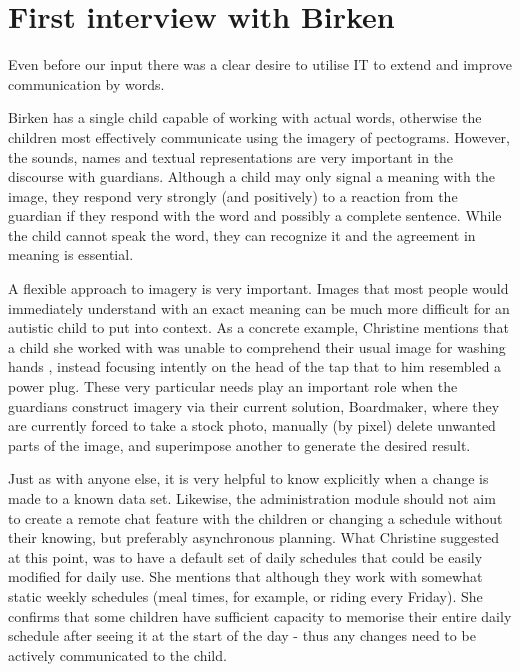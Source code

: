 \section{First interview with Birken}
\label{first_interview_birken}


Even before our input there was a clear desire to utilise IT to extend and improve communication by words.

Birken has a single child capable of working with actual words, otherwise the children most effectively communicate using the imagery of pectograms. However, the sounds, names and textual representations are very important in the discourse with guardians. Although a child may only signal a meaning with the image, they respond very strongly (and positively) to a reaction from the guardian if they respond with the word and possibly a complete sentence. While the child cannot speak the word, they can recognize it and the agreement in meaning is essential.

A flexible approach to imagery is very important. Images that most people would immediately understand with an exact meaning can be much more difficult for an autistic child to put into context. As a concrete example, Christine mentions that a child she worked with was unable to comprehend their usual image for washing hands , instead focusing intently on the head of the tap that to him resembled a power plug. These very particular needs play an important role when the guardians construct imagery via their current solution, Boardmaker, where they are currently forced to take a stock photo, manually (by pixel) delete unwanted parts of the image, and superimpose another to generate the desired result.

 Just as with anyone else, it is very helpful to know explicitly when a change is made to a known data set. Likewise, the administration module should not aim to create a remote chat feature with the children or changing a schedule without their knowing, but preferably asynchronous planning. What Christine suggested at this point, was to have a default set of daily schedules that could be easily modified for daily use. She mentions that although they work with somewhat static weekly schedules (meal times, for example, or riding every Friday). She confirms that some children have sufficient capacity to memorise their entire daily schedule after seeing it at the start of the day - thus any changes need to be actively communicated to the child.

